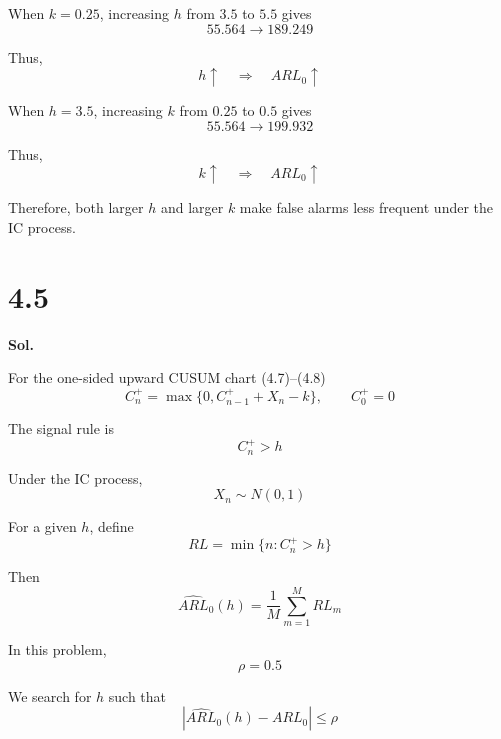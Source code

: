 \documentclass[a4paper, 12pt]{article}  %
\begin{document}
When \(k=0.25\), increasing \(h\) from \(3.5\) to \(5.5\) gives
\[
55.564 \longrightarrow 189.249
\]

Thus,
\[
h\uparrow \quad \Rightarrow \quad ARL_0\uparrow
\]

When \(h=3.5\), increasing \(k\) from \(0.25\) to \(0.5\) gives
\[
55.564 \longrightarrow 199.932
\]

Thus,
\[
k\uparrow \quad \Rightarrow \quad ARL_0\uparrow
\]

Therefore, both larger \(h\) and larger \(k\) make false alarms less frequent under the IC process.

\section*{4.5}
\textbf{Sol.}

For the one-sided upward CUSUM chart (4.7)--(4.8)
\[
C_n^+=\max\{0,C_{n-1}^+ + X_n-k\},
\qquad C_0^+=0
\]

The signal rule is
\[
C_n^+>h
\]

Under the IC process,
\[
X_n\sim N(0,1)
\]

For a given \(h\), define
\[
RL=\min\{n:C_n^+>h\}
\]

Then
\[
\widehat{ARL}_0(h)=\frac{1}{M}\sum_{m=1}^M RL_m
\]

In this problem,
\[
\rho=0.5
\]

We search for \(h\) such that
\[
\left|\widehat{ARL}_0(h)-ARL_0\right|\leq \rho
\]
\end{document}
